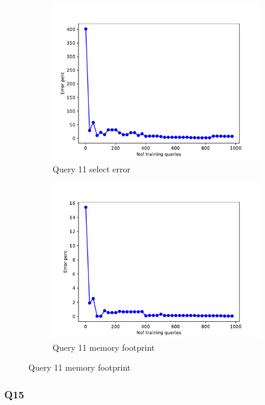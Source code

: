 \begin{figure}[t!]
 \begin{subfigure}[t]{0.5\textwidth}
   \includegraphics[scale=0.4]{figs/airtraffic/airtraffic_sel11_error.pdf}
   \caption{Query 11 select error}
   \label{fig:sel11}
 \end{subfigure}
 \begin{subfigure}[t]{0.5\textwidth}
   \includegraphics[scale=0.4]{figs/airtraffic/airtraffic_q11_memerror.pdf}
   \caption{Query 11 memory footprint}
   \label{fig:sel11}
  \end{subfigure}


\end{figure}


\subsubsection{Q15}

